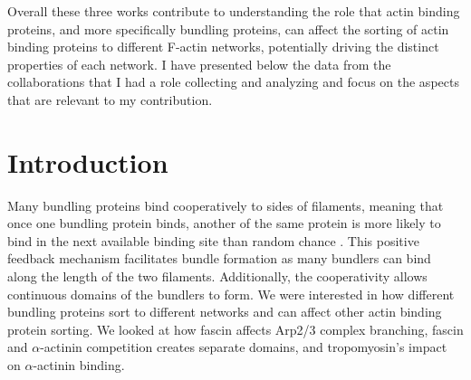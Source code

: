 Overall these three works contribute to understanding the role that actin binding proteins, and more specifically bundling proteins, can affect the sorting of actin binding proteins to different F-actin networks, potentially driving the distinct properties of each network. I have presented below the data from the collaborations that I had a role collecting and analyzing and focus on the aspects that are relevant to my contribution. 


\section{Introduction}\label{ch03-introduction}

Many bundling proteins bind cooperatively to sides of filaments, 
meaning that once one bundling protein binds, another of the same 
protein is more likely to bind in the next available binding site 
than random chance \citep{winkelman_fascin-_2016}. This positive 
feedback mechanism facilitates bundle formation as many bundlers can
bind along the length of the two filaments. Additionally, the cooperativity allows continuous domains of the bundlers to form. We were interested in how different bundling proteins sort to different networks and can affect other actin binding protein sorting. We looked at how fascin affects Arp2/3 complex branching, fascin and $\alpha$-actinin competition creates separate domains, and tropomyosin's impact on $\alpha$-actinin binding. 

